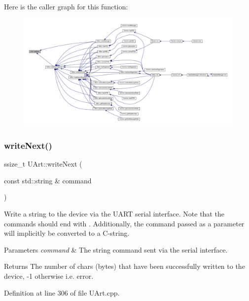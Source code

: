 Here is the caller graph for this function\+:
\nopagebreak
\begin{figure}[H]
\begin{center}
\leavevmode
\includegraphics[width=350pt]{d9/d88/class_u_art_aa4818ca67447e251680b4b8d28c8bba5_icgraph}
\end{center}
\end{figure}
\mbox{\label{class_u_art_aad1ddb133fe430a92527584eec2e674f}} 
\subsubsection{\texorpdfstring{write\+Next()}{writeNext()}\hspace{0.1cm}{\footnotesize\ttfamily [1/2]}}
{\footnotesize\ttfamily ssize\+\_\+t U\+Art\+::write\+Next (\begin{DoxyParamCaption}\item[{const std\+::string \&}]{command }\end{DoxyParamCaption})}

Write a string to the device via the U\+A\+RT serial interface. Note that the commands should end with . Additionally, the command passed as a parameter will implicitly be converted to a C-\/string.


\begin{DoxyParams}{Parameters}
{\em command} & The string command sent via the serial interface. \\
\hline
\end{DoxyParams}
\begin{DoxyReturn}{Returns}
The number of chars (bytes) that have been successfully written to the device, -\/1 otherwise i.\+e. error. 
\end{DoxyReturn}


Definition at line 306 of file U\+Art.\+cpp.


